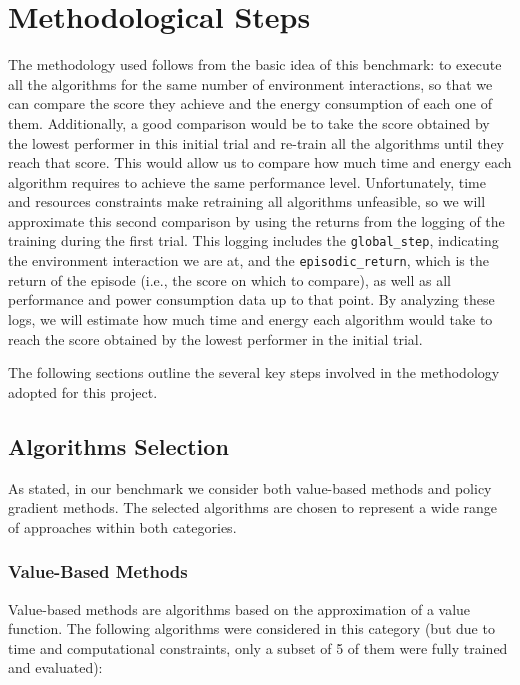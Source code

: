 \section[Methodological Steps]{Methodological Steps}
\label{sec:methodologies}

The methodology used follows from the basic idea of this benchmark: to execute all the algorithms for the same number of environment interactions, so that we can compare the score they achieve and the energy consumption of each one of them. Additionally, a good comparison would be to take the score obtained by the lowest performer in this initial trial and re-train all the algorithms until they reach that score. This would allow us to compare how much time and energy each algorithm requires to achieve the same performance level. Unfortunately, time and resources constraints make retraining all algorithms unfeasible, so we will approximate this second comparison by using the returns from the logging of the training during the first trial. This logging includes the \verb*|global_step|, indicating the environment interaction we are at, and the \verb*|episodic_return|, which is the return of the episode (i.e., the score on which to compare), as well as all performance and power consumption data up to that point. By analyzing these logs, we will estimate how much time and energy each algorithm would take to reach the score obtained by the lowest performer in the initial trial. 

The following sections outline the several key steps involved in the methodology adopted for this project.

\subsection{Algorithms Selection}
\label{subsec:algorithm_selection}

As stated, in our benchmark we consider both value-based methods and policy gradient methods. The selected algorithms are chosen to represent a wide range of approaches within both categories.

\subsubsection{Value-Based Methods}

Value-based methods are algorithms based on the approximation of a value function. The following algorithms were considered in this category (but due to time and computational constraints, only a subset of 5 of them were fully trained and evaluated):

